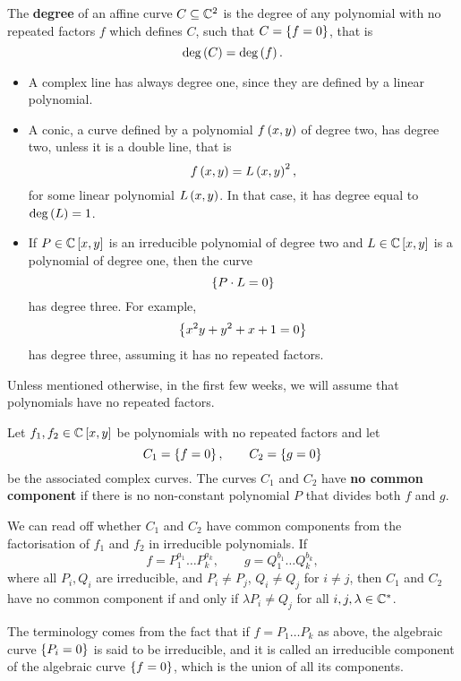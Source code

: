 \begin{definition}
The \textbf{degree} of an affine curve $ C \subseteq \mathbb{C}^2 $ is the degree of any polynomial with no repeated factors $ f $ which defines $ C $, such that $ C = \left\{ f = 0 \right\} $, that is
$$ \deg\left( C \right) = \deg\left( f \right). $$
\end{definition}

\begin{example}
\hfill
\begin{itemize}
\item A complex line has always degree one, since they are defined by a linear polynomial.
\item A conic, a curve defined by a polynomial $ f\left( x, y \right) $ of degree two, has degree two, unless it is a double line, that is
$$ f\left( x, y \right) = L\left( x, y \right)^2, $$
for some linear polynomial $ L\left( x, y \right) $. In that case, it has degree equal to $ \deg\left( L \right) = 1 $.
\item If $ P \in \mathbb{C}\left[ x, y \right] $ is an irreducible polynomial of degree two and $ L \in \mathbb{C}\left[ x, y \right] $ is a polynomial of degree one, then the curve
$$ \left\{ P \cdot L = 0 \right\} $$
has degree three. For example,
$$ \left\{ x^2y + y^2 + x + 1 = 0 \right\} $$
has degree three, assuming it has no repeated factors.
\end{itemize}
\end{example}

Unless mentioned otherwise, in the first few weeks, we will assume that polynomials have no repeated factors.

\begin{definition}
Let $ f_1, f_2 \in \mathbb{C}\left[ x, y \right] $ be polynomials with no repeated factors and let
$$ C_1 = \left\{ f = 0 \right\}, \qquad C_2 = \left\{ g = 0 \right\} $$
be the associated complex curves. The curves $ C_1 $ and $ C_2 $ have \textbf{no common component} if there is no non-constant polynomial $ P $ that divides both $ f $ and $ g $.
\end{definition}

We can read off whether $ C_1 $ and $ C_2 $ have common components from the factorisation of $ f_1 $ and $ f_2 $ in irreducible polynomials. If
$$ f = P_1^{a_1} \dots P_k^{a_k}, \qquad g = Q_1^{b_1} \dots Q_k^{b_k}, $$
where all $ P_i, Q_i $ are irreducible, and $ P_i \ne P_j $, $ Q_i \ne Q_j $ for $ i \ne j $, then $ C_1 $ and $ C_2 $ have no common component if and only if $ \lambda P_i \ne Q_j $ for all $ i, j, \lambda \in \mathbb{C}^* $.

\begin{remark}
The terminology comes from the fact that if $ f = P_1 \dots P_k $ as above, the algebraic curve $ \left\{ P_i = 0 \right\} $ is said to be irreducible, and it is called an irreducible component of the algebraic curve $ \left\{ f = 0 \right\} $, which is the union of all its components.
\end{remark}

